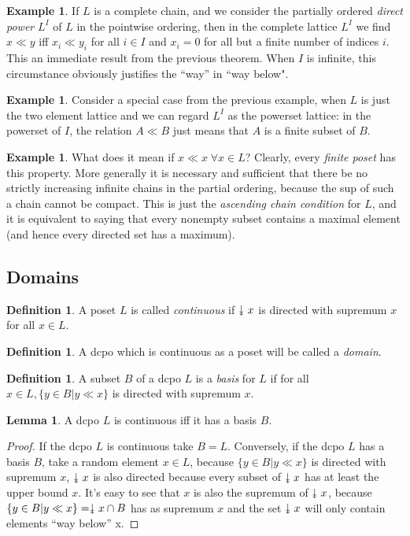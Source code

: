 \documentclass[a4paper,12pt]{article}
\newcommand{\downdownarrow}{\mathrel{\reflectbox{\rotatebox[origin=c]{90}{$\twoheadleftarrow$}}}}
\theoremstyle{definition}
\newtheorem{lemma}[theorem]{Lemma}
\newtheorem{example}[theorem]{Example}
\newtheorem{definition}[theorem]{Definition}
\begin{document}
\begin{example}
If $L$ is a complete chain, and we consider the partially ordered \emph{direct power} $L^I$ of $L$ in the pointwise ordering, then in the complete lattice $L^I$ we find $x \ll y$ iff $x_i \ll y_i$ for all $i \in I$ and $x_i = 0$ for all but a finite number of indices $i$. This an immediate result from the previous theorem. When $I$ is infinite, this circumstance obviously justifies the ``way'' in ``way below".
\end{example}
\begin{example}
Consider a special case from the previous example, when $L$ is just the two element lattice and we can regard $L^I$ as the powerset lattice: in the powerset of $I$, the relation $A \ll B$ just means that $A$ is a finite subset of $B$.
\end{example}

\begin{example}
What does it mean if $x \ll x \; \forall x \in L$? Clearly, every \emph{finite poset} has this property. More generally it is necessary and sufficient that there be no strictly increasing infinite chains in the partial ordering, because the sup of such a chain cannot be compact. This is just the \emph{ascending chain condition} for $L$, and it is equivalent to saying that every nonempty subset contains a maximal element (and hence every directed set has a maximum).
\end{example}

\subsection{Domains}
\begin{definition}
A poset $L$ is called \emph{continuous} if $\downdownarrow x$ is directed with supremum $x$ for all $x \in L$.
\end{definition}

\begin{definition}
A dcpo which is continuous as a poset will be called a \emph{domain}.
\end{definition}


\begin{definition}
A subset $B$ of a dcpo $L$ is a \emph{basis} for $L$  if for all $x \in L, \{y \in B | y \ll x \}$ is directed with supremum $x$.
\end{definition}

\begin{lemma}
A dcpo $L$ is continuous iff it has a basis $B$.
\end{lemma}
\begin{proof}
If the dcpo $L$ is continuous take $B = L$. Conversely, if the dcpo $L$ has a basis $B$, take a random element $x \in L$, because $\{y \in B | y \ll x \}$ is directed with supremum $x$, $\downdownarrow x$ is also directed because every subset of $\downdownarrow x$  has at least the upper bound $x$. It's easy to see that $x$ is also the supremum of $\downdownarrow x$, because $\{y \in B | y \ll x \} = \downdownarrow x \cap B$ has as supremum $x$ and the set $ \downdownarrow x$ will only contain elements ``way below'' x.
\end{proof}
\end{document}
